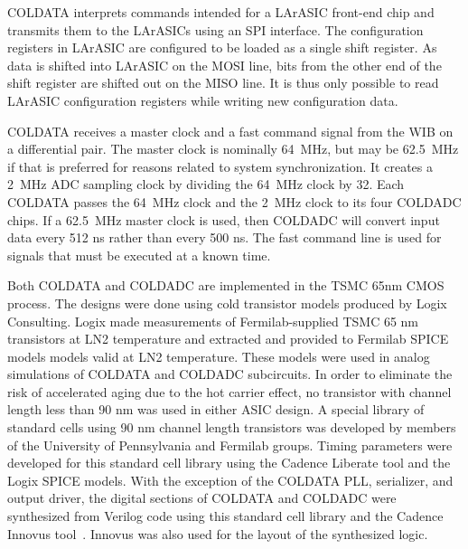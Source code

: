 COLDATA interprets commands intended for a LArASIC front-end chip and transmits them to the LArASICs using an SPI\cite{SPI} interface.  The configuration registers in LArASIC are configured to be loaded as a single shift register.  As data is shifted into LArASIC on the MOSI line, bits from the other end of the shift register are shifted out on the MISO line.  It is thus only possible to read LArASIC configuration registers while writing new configuration data.

COLDATA receives a master clock and a fast command signal from the WIB on a differential pair.  The master clock is nominally \SI{64}{MHz}, but may be \SI{62.5}{MHz} if that is preferred for reasons related to system synchronization.  It creates a \SI{2}{MHz} ADC sampling clock by dividing the \SI{64}{MHz} clock by 32.  Each COLDATA passes the \SI{64}{MHz} clock and the \SI{2}{MHz} clock to its four COLDADC chips.  If a \SI{62.5}{MHz} master clock is used, then COLDADC will convert input data every 512 ns rather than every 500 ns.  The fast command line is used for signals that must be executed at a known time.

Both COLDATA and COLDADC are implemented in the TSMC 65nm CMOS process.\cite{TSMC65} The designs were done using cold transistor models produced by Logix Consulting.\cite{Logix} Logix made measurements of Fermilab-supplied TSMC 65 nm transistors at LN2 temperature and extracted and provided to Fermilab SPICE \cite{SPICE} models models valid at LN2 temperature.  These models were used in analog simulations of COLDATA and COLDADC subcircuits.  In order to eliminate the risk of accelerated aging due to the hot carrier effect,\cite{Hot-electron} no transistor with channel length less than 90 nm was used in either ASIC design.  A special library of standard cells using 90 nm channel length transistors was developed by members of the University of Pennsylvania and Fermilab groups.  Timing parameters were developed for this standard cell library using the Cadence Liberate tool\cite{Liberate} and the Logix SPICE models.  With the exception of the COLDATA PLL, serializer, and output driver, the digital sections of COLDATA and COLDADC were synthesized from Verilog code using this standard cell library and the Cadence Innovus tool~\cite{Innovus}. Innovus was also used for the layout of the synthesized logic.


